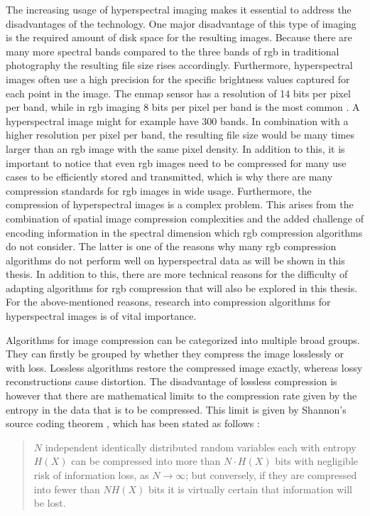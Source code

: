 The increasing usage of hyperspectral imaging makes it essential to address the disadvantages of the technology. One major disadvantage of this type of imaging is the required amount of disk space for the resulting images. Because there are many more spectral bands compared to the three bands of \ac{rgb} in traditional photography the resulting file size rises accordingly. Furthermore, hyperspectral images often use a high precision for the specific brightness values captured for each point in the image. The \ac{enmap} sensor has a resolution of 14 bits per pixel per band, while in \ac{rgb} imaging 8 bits per pixel per band is the most common \citep{guanter_enmap_2015}. A hyperspectral image might for example have 300 bands. In combination with a higher resolution per pixel per band, the resulting file size would be many times larger than an \ac{rgb} image with the same pixel density. In addition to this, it is important to notice that even \ac{rgb} images need to be compressed for many use cases to be efficiently stored and transmitted, which is why there are many compression standards for \ac{rgb} images in wide usage.
Furthermore, the compression of hyperspectral images is a complex problem. This arises from the combination of spatial image compression complexities and the added challenge of encoding information in the spectral dimension which \ac{rgb} compression algorithms do not consider. The latter is one of the reasons why many \ac{rgb} compression algorithms do not perform well on hyperspectral data as will be shown in this thesis. In addition to this, there are more technical reasons for the difficulty of adapting algorithms for \ac{rgb} compression that will also be explored in this thesis. For the above-mentioned reasons, research into compression algorithms for hyperspectral images is of vital importance.

Algorithms for image compression can be categorized into multiple broad groups. They can firstly be grouped by whether they compress the image losslessly or with loss. Lossless algorithms restore the compressed image exactly, whereas lossy reconstructions cause distortion. The disadvantage of lossless compression is however that there are mathematical limits to the compression rate given by the entropy in the data that is to be compressed. This limit is given by Shannon's source coding theorem \citep{shannon_mathematical_1948}, which has been stated as follows \citep{mackay_information_2003}:

\begin{quotation}
$N$ independent identically distributed random variables each with entropy $H(X)$ can be compressed into more than $N\cdot H(X)$ bits with negligible risk of information loss, as $N \rightarrow \infty$; but conversely, if they are compressed into fewer than $NH(X)$ bits it is virtually certain that information will be lost.
\end{quotation}

